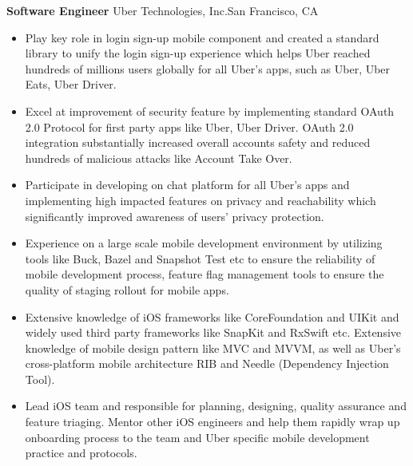 \documentclass[10pt,letterpaper,sans]{moderncv}        %
\begin{document}
{\textbf{Software Engineer}}
{Uber Technologies, Inc.}{San Francisco, CA}{}{
\begin{itemize} 
\item Play key role in login sign-up mobile component and created a standard library to unify the login sign-up experience which helps Uber reached hundreds of millions users globally for all Uber's apps, such as Uber, Uber Eats, Uber Driver. 
\item Excel at improvement of security feature by implementing standard OAuth 2.0 Protocol for first party apps like Uber, Uber Driver. OAuth 2.0 integration substantially increased overall accounts safety and reduced hundreds of malicious attacks like Account Take Over.
\item Participate in developing on chat platform for all Uber's apps and implementing high impacted features on privacy and reachability which significantly improved awareness of users' privacy protection. 
\item Experience on a large scale mobile development environment by utilizing tools like Buck, Bazel and Snapshot Test etc to ensure the reliability of mobile development process, feature flag management tools to ensure the quality of staging rollout for mobile apps. 
\item Extensive knowledge of iOS frameworks like CoreFoundation and UIKit and widely used third party frameworks like SnapKit and RxSwift etc. Extensive knowledge of mobile design pattern like MVC and MVVM, as well as Uber's cross-platform mobile architecture RIB and Needle (Dependency Injection Tool).
\item Lead iOS team and responsible for planning, designing, quality assurance and feature triaging. Mentor other iOS engineers and help them rapidly wrap up onboarding process to the team and Uber specific mobile development practice and protocols. 
\end{itemize}} 
\end{document}
